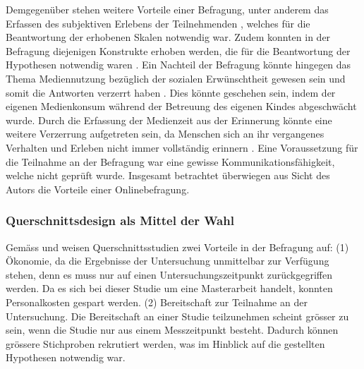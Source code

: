 Demgegenüber stehen weitere Vorteile einer Befragung,  unter anderem das Erfassen des subjektiven Erlebens der Teilnehmenden \cite{Berk2005}, welches für die Beantwortung der erhobenen Skalen notwendig war. Zudem konnten in der Befragung diejenigen Konstrukte erhoben werden, die für die Beantwortung der Hypothesen notwendig waren \cite{Berk2005}. Ein Nachteil der Befragung könnte hingegen das Thema Mediennutzung bezüglich der sozialen Erwünschtheit gewesen sein und somit die Antworten verzerrt haben \cite{Rey2012}. Dies könnte geschehen sein, indem der eigenen Medienkonsum während der Betreuung des eigenen Kindes abgeschwächt wurde. Durch die Erfassung der Medienzeit aus der Erinnerung könnte eine weitere Verzerrung aufgetreten sein, da Menschen sich an ihr vergangenes Verhalten und Erleben nicht immer vollständig erinnern \cite{Berk2005}. Eine Voraussetzung für die Teilnahme an der Befragung war eine gewisse Kommunikationsfähigkeit, welche nicht geprüft wurde. Insgesamt betrachtet überwiegen aus Sicht des Autors die Vorteile einer Onlinebefragung. 

\subsubsection{Querschnittsdesign als Mittel der Wahl}
Gemäss  und  weisen Querschnittsstudien zwei Vorteile in der Befragung auf: (1) Ökonomie, da die Ergebnisse der Untersuchung unmittelbar zur Verfügung stehen, denn es muss nur auf einen Untersuchungszeitpunkt zurückgegriffen werden. Da es sich bei dieser Studie um eine Masterarbeit handelt, konnten Personalkosten gespart werden. (2) Bereitschaft zur Teilnahme an der Untersuchung. Die Bereitschaft an einer Studie teilzunehmen scheint grösser zu sein, wenn die Studie nur aus einem Messzeitpunkt besteht. Dadurch können grössere Stichproben rekrutiert werden, was im Hinblick auf die gestellten Hypothesen notwendig war. 

